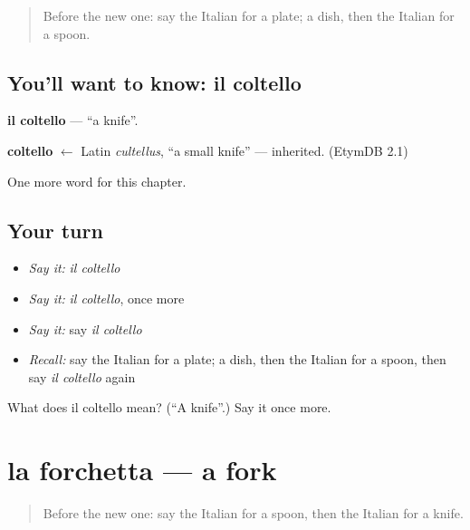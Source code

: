 \label{lesson:IT-C59-coltello}



\begin{quote}
Before the new one: say the Italian for a plate; a dish, then the Italian for a spoon.
\end{quote}

\subsection*{You'll want to know: il coltello}
\textbf{il coltello} — \textquotedblleft{}a knife\textquotedblright{}.

\begin{cousinweb}
\textbf{coltello} $\leftarrow$ Latin \emph{cultellus}, \textquotedblleft{}a small knife\textquotedblright{} — inherited. (EtymDB 2.1)
\end{cousinweb}

\begin{grammarlens}[title={What you've built}]
One more word for this chapter.
\end{grammarlens}

\subsection*{Your turn}
\begin{itemize}
\raggedright
  \item \emph{Say it:} \emph{il coltello}
  \item \emph{Say it:} \emph{il coltello}, once more
  \item \emph{Say it:} say \emph{il coltello}
  \item \emph{Recall:} say the Italian for a plate; a dish, then the Italian for a spoon, then say \emph{il coltello} again
\end{itemize}

\begin{tcolorbox}[breakable,colback=teal!4,colframe=teal!35!black,title={Before you move on}]
What does il coltello mean? (\textquotedblleft{}A knife\textquotedblright{}.) Say it once more.
\end{tcolorbox}
\section[la forchetta]{la forchetta — a fork}

\label{lesson:IT-C59-forchetta}



\begin{quote}
Before the new one: say the Italian for a spoon, then the Italian for a knife.
\end{quote}

